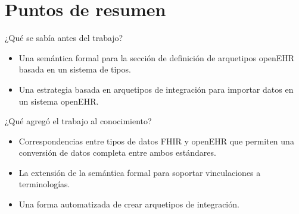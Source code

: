 \section*{Puntos de resumen}

¿Qué se sabía antes del trabajo?

\begin{itemize}
  \item Una semántica formal para la sección de definición de arquetipos openEHR basada en un sistema de tipos.
  \item Una estrategia basada en arquetipos de integración para importar datos en un sistema openEHR.
\end{itemize}

¿Qué agregó el trabajo al conocimiento?

\begin{itemize}
  \item Correspondencias entre tipos de datos FHIR y openEHR que permiten una conversión de datos completa entre ambos estándares.
  \item La extensión de la semántica formal para soportar vinculaciones a terminologías.
  \item Una forma automatizada de crear arquetipos de integración.
\end{itemize}
